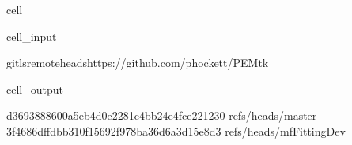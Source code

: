 \documentclass[letterpaper,table,10pt,english]{jupyterBook}
\begin{document}
\begin{sphinxuseclass}{cell}\begin{sphinxVerbatimInput}

\begin{sphinxuseclass}{cell_input}
\begin{sphinxVerbatim}[commandchars=\\\{\}]
gitls\PYGZhy{}remote\PYGZhy{}\PYGZhy{}headshttps://github.com/phockett/PEMtk
\end{sphinxVerbatim}

\end{sphinxuseclass}\end{sphinxVerbatimInput}
\begin{sphinxVerbatimOutput}

\begin{sphinxuseclass}{cell_output}
\begin{sphinxVerbatim}[commandchars=\\\{\}]
d3693888600a5eb4d0e2281c4bb24e4fce221230	refs/heads/master
3f4686dffdbb310f15692f978ba36d6a3d15e8d3	refs/heads/mfFittingDev
\end{sphinxVerbatim}

\end{sphinxuseclass}\end{sphinxVerbatimOutput}

\end{sphinxuseclass}
\end{document}
